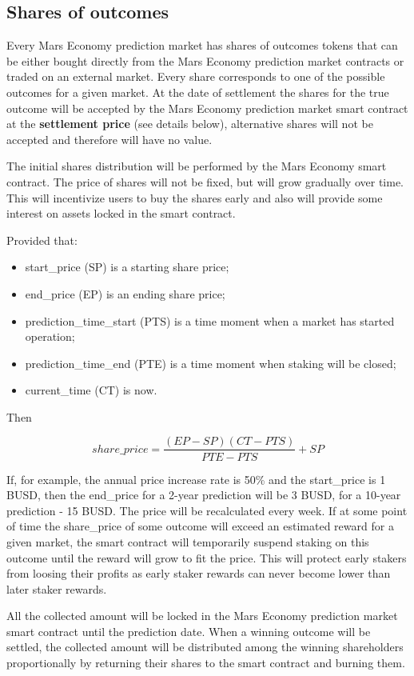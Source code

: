 \documentclass[12pt]{article}
\begin{document}
\subsection{Shares of outcomes}
Every Mars Economy prediction market has shares of outcomes tokens that can be either bought directly from the Mars Economy prediction market contracts or traded on an external market. Every share corresponds to one of the possible outcomes for a given market. At the date of settlement the shares for the true outcome will be accepted by the Mars Economy prediction market smart contract at the \textbf{settlement price} (see details below), alternative shares will not be accepted and therefore will have no value.

The initial shares distribution will be performed by the Mars Economy smart contract. The price of shares will not be fixed, but will grow gradually over time. This will incentivize users to buy the shares early and also will provide some interest on assets locked in the smart contract. 

Provided that:
\begin{itemize}
    \item start\_price (SP) is a starting share price;
    \item end\_price (EP) is an ending share price;
    \item prediction\_time\_start (PTS) is a time moment when a market has started operation;
    \item prediction\_time\_end (PTE) is a time moment when staking will be closed;
    \item current\_time (CT) is now.
\end{itemize}

Then

\[ share\_price = \frac{(EP - SP)(CT - PTS)}{PTE - PTS} + SP\]

If, for example, the annual price increase rate is 50\% and the start\_price is 1 BUSD, then the end\_price for a 2-year prediction will be 3 BUSD, for a 10-year prediction - 15 BUSD. The price will be recalculated every week. If at some point of time the share\_price of some outcome will exceed an estimated reward for a given market, the smart contract will temporarily suspend staking on this outcome until the reward will grow to fit the price. This will protect early stakers from loosing their profits as early staker rewards can never become lower than later staker rewards.

All the collected amount will be locked in the Mars Economy prediction market smart contract until the prediction date. When a winning outcome will be settled, the collected amount will be distributed among the winning shareholders proportionally by returning their shares to the smart contract and burning them.
\end{document}
